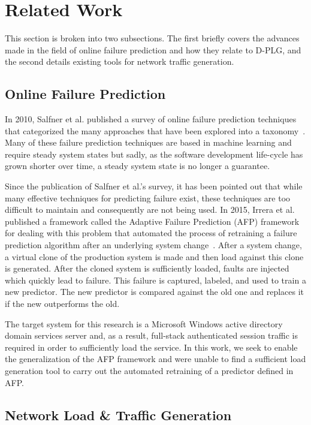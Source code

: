 \section{Related Work} \label{sec:relatedWork} 
This section is broken into two subsections.  The first briefly covers the
advances made in the field of online failure prediction and how they relate to
D-PLG, and the second details existing tools for network traffic generation.

\subsection{Online Failure Prediction}
In 2010, Salfner et al. published a survey of online failure prediction
techniques that categorized the many approaches that have been explored into a
taxonomy~\cite{salfnerSurvey}.  Many of these failure prediction techniques are
based in machine learning and require steady system states but sadly, as the
software development life-cycle has grown shorter over time, a steady system
state is no longer a guarantee.

Since the publication of Salfner et al.'s survey, it has been pointed out that
while many effective techniques for predicting failure exist, these techniques
are too difficult to maintain and consequently are not being used.  In 2015,
Irrera et al. published a framework called the Adaptive Failure Prediction
(AFP) framework for dealing with this problem that automated the process of
retraining a failure prediction algorithm after an underlying system
change~\cite{irrera2015}.  After a system change, a virtual clone of the
production system is made and then load against this clone is generated.  After
the cloned system is sufficiently loaded, faults are injected which quickly
lead to failure.  This failure is captured, labeled, and used to train a new
predictor.  The new predictor is compared against the old one and replaces it
if the new outperforms the old.

The target system for this research is a Microsoft Windows active directory
domain services server and, as a result, full-stack authenticated session
traffic is required in order to sufficiently load the service.  In this work,
we seek to enable the generalization of the AFP framework and were unable to
find a sufficient load generation tool to carry out the automated retraining of
a predictor defined in AFP.

\subsection{Network Load \& Traffic Generation}

